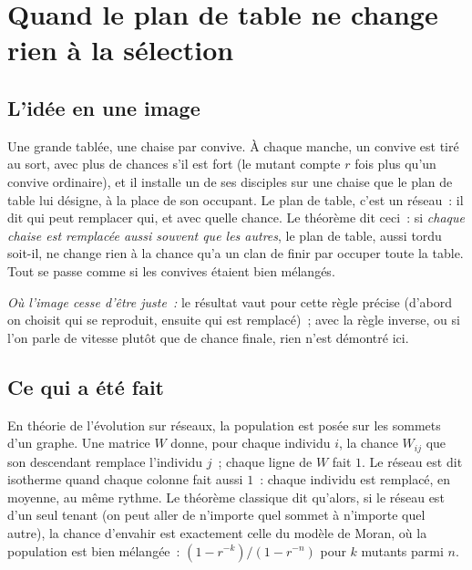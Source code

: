 \chapter[Le plan de table et la sélection]{Quand le plan de table ne change rien à la sélection}

\section*{L'idée en une image}

\begin{analogie}
Une grande tablée, une chaise par convive. À chaque manche, un convive est tiré au sort, avec plus de chances s'il
est \og fort\fg{} (le mutant compte $r$ fois plus qu'un convive ordinaire), et il installe un de ses disciples sur une
chaise que le plan de table lui désigne, à la place de son occupant. Le plan de table, c'est un réseau~: il dit qui
peut remplacer qui, et avec quelle chance. Le théorème dit ceci~: si \emph{chaque chaise est remplacée aussi
souvent que les autres}, le plan de table, aussi tordu soit-il, ne change rien à la chance qu'a un clan de finir par
occuper toute la table. Tout se passe comme si les convives étaient bien mélangés.

\emph{Où l'image cesse d'être juste~:} le résultat vaut pour cette règle précise (d'abord on choisit qui se
reproduit, ensuite qui est remplacé)~; avec la règle inverse, ou si l'on parle de vitesse plutôt que de chance
finale, rien n'est démontré ici.
\end{analogie}

\section*{Ce qui a été fait}

En théorie de l'évolution sur réseaux, la population est posée sur les sommets d'un graphe. Une matrice $W$ donne,
pour chaque individu $i$, la chance $W_{ij}$ que son descendant remplace l'individu $j$~; chaque ligne de $W$ fait
$1$. Le réseau est dit \og isotherme\fg{} quand chaque colonne fait aussi $1$~: chaque individu est remplacé, en
moyenne, au même rythme. Le théorème classique dit qu'alors, si le réseau est d'un seul tenant (on peut aller de
n'importe quel sommet à n'importe quel autre), la chance d'envahir est exactement celle du modèle de Moran, où la population
est bien mélangée~: $(1-r^{-k})/(1-r^{-n})$ pour $k$ mutants parmi $n$.

